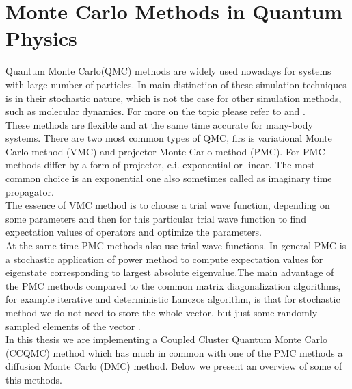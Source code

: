 \documentclass[twoside,english]{uiofysmaster}
\theoremstyle{definition}
\begin{document}
\chapter{Monte Carlo Methods in Quantum Physics}\label{ch:MCalgo}
Quantum Monte Carlo(QMC) methods are widely used nowadays for systems with large number of particles. In main distinction of these simulation techniques is in their stochastic nature, which is not the case for other simulation methods, such as molecular dynamics. For more on the topic please refer to \cite{hammondMonteCarloMethods1994} and \cite{kalosMonteCarloMethods2008}. \\
These methods are flexible and at the same time accurate for many-body systems. There are two most common types of QMC, firs is variational Monte Carlo method (VMC) and projector Monte Carlo method (PMC). For PMC methods differ by a form of projector, e.i. exponential or linear. The most common choice is an exponential one also sometimes called as imaginary time propagator.\\
The essence of VMC method is to choose a trial wave function, depending on some parameters and then for this particular trial wave function to find expectation values of operators and optimize the parameters.\\
At the same time PMC methods also use trial wave functions. In general PMC is a stochastic application of power method to compute expectation values for eigenstate corresponding to largest absolute eigenvalue.The main advantage of the PMC methods compared to the common matrix diagonalization algorithms, for example iterative and deterministic Lanczos algorithm, is that for stochastic method we do not need to store the whole vector, but just some randomly sampled elements of the vector \cite{umrigarObservationsVariationalProjector2015}. \\
In this thesis we are implementing a Coupled Cluster Quantum Monte Carlo (CCQMC) method which has much in common with one of the PMC methods a diffusion Monte Carlo (DMC) method. Below we present an overview of some of this methods.
\end{document}
